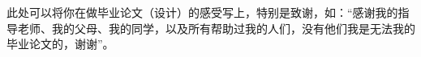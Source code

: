 \begin{acknowledgements}

此处可以将你在做毕业论文（设计）的感受写上，特别是致谢，如：“感谢我的指导老师、我的父母、我的同学，以及所有帮助过我的人们，没有他们我是无法我的毕业论文的，谢谢”。

\end{acknowledgements}
